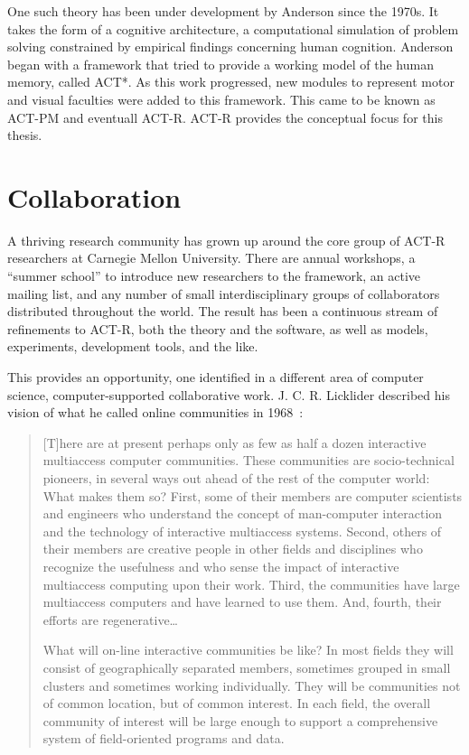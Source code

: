 One such theory has been under development by Anderson since the
1970s.  It takes the form of a cognitive architecture, a computational
simulation of problem solving constrained by empirical findings
concerning human cognition.  Anderson began with a framework that
tried to provide a working model of the human memory, called ACT*.  As
this work progressed, new modules to represent motor and visual
faculties were added to this framework. This came to be known as
ACT-PM and eventuall ACT-R.  ACT-R provides the conceptual focus for
this thesis.

\section {Collaboration}
A thriving research community has grown up around the core group of
ACT-R researchers at Carnegie Mellon University.  There are annual
workshops, a ``summer school'' to introduce new researchers to the
framework, an active mailing list, and any number of small
interdisciplinary groups of collaborators distributed throughout the
world.  The result has been a continuous stream of refinements to
ACT-R, both the theory and the software, as well as models,
experiments, development tools, and the like.

This provides an opportunity, one identified in a different area of
computer science, computer-supported collaborative work.
J. C. R. Licklider described his vision of what he called online
communities in 1968~\cite{licklider1968computer}:

\begin{quotation}
 [T]here are at present perhaps only as few as half a dozen
  interactive multiaccess computer communities. These communities are
  socio-technical pioneers, in several ways out ahead of the rest of
  the computer world: What makes them so? First, some of their members
  are computer scientists and engineers who understand the concept of
  man-computer interaction and the technology of interactive
  multiaccess systems. Second, others of their members are creative
  people in other fields and disciplines who recognize the usefulness
  and who sense the impact of interactive multiaccess computing upon
  their work. Third, the communities have large multiaccess computers
  and have learned to use them. And, fourth, their efforts are
  regenerative\ldots
 
 What will on-line interactive communities be like? In most
  fields they will consist of geographically separated members,
  sometimes grouped in small clusters and sometimes working
  individually. They will be communities not of common location, but
  of common interest. In each field, the overall community of interest
  will be large enough to support a comprehensive system of
  field-oriented programs and data.
\end{quotation}

